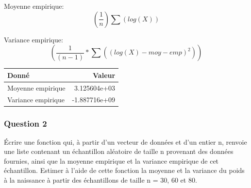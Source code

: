 \documentclass[
]{article}
\newenvironment{Shaded}{\begin{snugshade}}{\end{snugshade}}
\newcommand{\AttributeTok}[1]{\textcolor[rgb]{0.77,0.63,0.00}{#1}}
\newcommand{\CommentTok}[1]{\textcolor[rgb]{0.56,0.35,0.01}{\textit{#1}}}
\newcommand{\DecValTok}[1]{\textcolor[rgb]{0.00,0.00,0.81}{#1}}
\newcommand{\FunctionTok}[1]{\textcolor[rgb]{0.00,0.00,0.00}{#1}}
\newcommand{\NormalTok}[1]{#1}
\newcommand{\OtherTok}[1]{\textcolor[rgb]{0.56,0.35,0.01}{#1}}
\newcommand{\SpecialCharTok}[1]{\textcolor[rgb]{0.00,0.00,0.00}{#1}}
\newcommand{\StringTok}[1]{\textcolor[rgb]{0.31,0.60,0.02}{#1}}
\begin{document}
Moyenne empirique: \[(\frac{1}{n}) \sum(log(X))\]

Variance empirique: \[(\frac{1}{(n-1)}*\sum((log(X)-moy-emp)^2))\]

\begin{Shaded}
\end{Shaded}

\begin{longtable}[]{@{}lr@{}}
\toprule()
Donné & Valeur \\
\midrule()
\endhead
Moyenne empirique & 3.125604e+03 \\
Variance empirique & -1.887716e+09 \\
\bottomrule()
\end{longtable}

\hypertarget{question-2}{%
\subsubsection{Question 2}\label{question-2}}

Écrire une fonction qui, à partir d'un vecteur de données et d'un entier
n, renvoie une liste contenant un échantillon aléatoire de taille n
provenant des données fournies, ainsi que la moyenne empirique et la
variance empirique de cet échantillon. Estimer à l'aide de cette
fonction la moyenne et la variance du poids à la naissance à partir des
échantillons de taille n = 30, 60 et 80.
\end{document}
